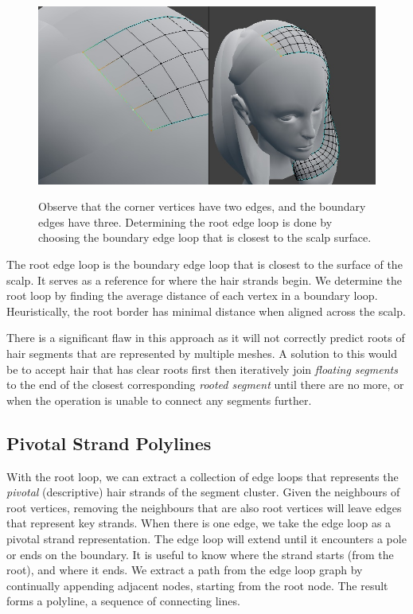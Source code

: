 \documentclass[ %
author={Dillon Keith Diep},
supervisor={Dr. Carl Henrik Ek},
degree={MEng},
title={ART-CG Hair:},
subtitle={Assisted Real-time Content Generation of Stylised Virtual Hair},
type={Research},
year={2017} ]{dissertation}
\begin{document}
\begin{figure}[!h]
	\centering
	\caption{Observe that the corner vertices have two edges, and the boundary edges have three. Determining the root edge loop is done by choosing the boundary edge loop that is closest to the scalp surface.}
	\includegraphics[scale=0.5]{images/rootLoop}\\
\end{figure}

The root edge loop is the boundary edge loop that is closest to the surface of the scalp. It serves as a reference for where the hair strands begin. We determine the root loop by finding the average distance of each vertex in a boundary loop. Heuristically, the root border has minimal distance when aligned across the scalp.

There is a significant flaw in this approach as it will not correctly predict roots of hair segments that are represented by multiple meshes. A solution to this would be to accept hair that has clear roots first then iteratively join \textit{floating segments} to the end of the closest corresponding \textit{rooted segment} until there are no more, or when the operation is unable to connect any segments further.	

\subsection{Pivotal Strand Polylines}
With the root loop, we can extract a collection of edge loops that represents the \textit{pivotal} (descriptive) hair strands of the segment cluster. Given the neighbours of root vertices, removing the neighbours that are also root vertices will leave edges that represent key strands. When there is one edge, we take the edge loop as a pivotal strand representation. The edge loop will extend until it encounters a pole or ends on the boundary. It is useful to know where the strand starts (from the root), and where it ends. We extract a path from the edge loop graph by continually appending adjacent nodes, starting from the root node. The result forms a polyline, a sequence of connecting lines.
\end{document}
